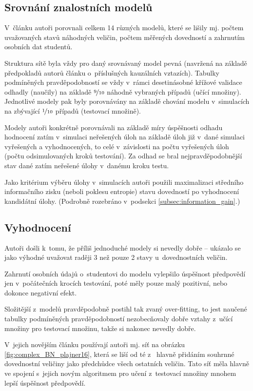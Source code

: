 \documentclass[a4paper,twoside,12pt]{scrbook}
\begin{document}
\subsection{Srovnání znalostních modelů}
V~článku autoři porovnali celkem 14 různých modelů, které se lišily mj. počtem uvažovaných stavů náhodných veličin, počtem měřených dovedností a zahrnutím osobních dat studentů.

Struktura sítě byla vždy pro daný srovnávaný model pevná (navržená na základě předpokladů autorů článku o~příslušných kauzálních vztazích). Tabulky podmíněných pravděpodobností se vždy v~rámci desetinásobné křížové validace odhadly (naučily) na základě $\nicefrac{9}{10}$ náhodně vybraných případů (učící množiny). Jednotlivé modely pak byly porovnávány na základě chování modelu v~simulacích na zbývající $\nicefrac{1}{10}$ případů (testovací množině).

Modely autoři konkrétně porovnávali na základě míry úspěšnosti odhadu hodnocení zatím v~simulaci neřešených úloh na základě úloh již v~dané simulaci vyřešených a vyhodnocených, to celé v~závislosti na počtu vyřešených úloh (počtu odsimulovaných kroků testování). Za odhad se bral nejpravděpodobnější stav dané zatím neřešené úlohy v~danému kroku testu.

Jako kritérium výběru úlohy v~simulacích autoři použili maximalizaci středního informačního zisku (neboli poklesu entropie) stavu dovedností po vyhodnocení kandidátní úlohy. (Podrobně rozebráno v~podsekci \ref{subsec:information_gain}.)

\subsection{Vyhodnocení}
Autoři došli k~tomu, že příliš jednoduché modely si nevedly dobře -- ukázalo se jako výhodné uvažovat raději 3 než pouze 2 stavy u~dovednostních veličin.

Zahrnutí osobních údajů o~studentovi do modelu vylepšilo úspěšnost předpovědí jen v~počátečních krocích testování, poté měly pouze malý pozitivní, nebo dokonce negativní efekt.

Složitější z~modelů pravděpodobně postihl tak zvaný over-fitting, to jest naučené tabulky podmíněných pravděpodobností nezobecňovaly dobře vztahy z~učící množiny pro testovací množinu, takže si nakonec nevedly dobře.

V~jejich novějším článku \cite{plajner16} používají autoři mj. síť na obrázku \ref{fig:complex_BN_plajner16}, která se liší od té z~\cite{vomlel_plajner2015} hlavně přidáním souhrnné dovednostní veličiny jako předchůdce všech ostatních veličin. Tato síť měla hlavně ve spojení s~jejich novým algoritmem pro učení z~testovací množiny mnohem lepší úspěšnost předpovědí.
\end{document}
